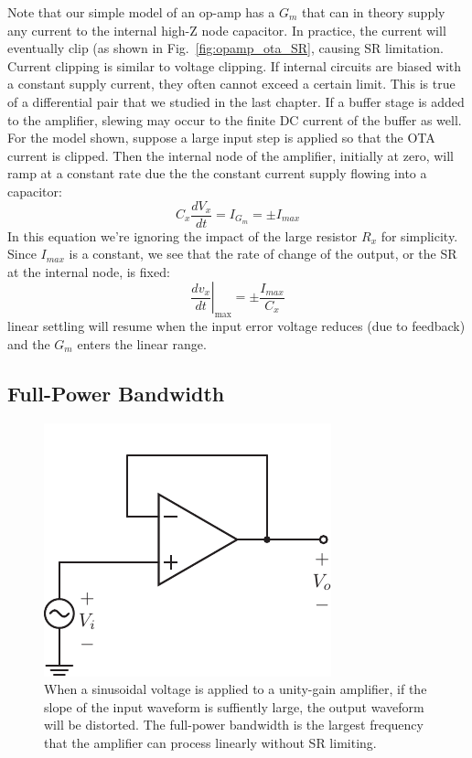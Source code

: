 Note that our simple model of an op-amp has a $G_m$ that can in theory supply any current to the internal high-Z node capacitor. In practice, the current will eventually clip (as shown in Fig.~\ref{fig:opamp_ota_SR}, causing SR limitation.  Current clipping is similar to voltage clipping. If internal circuits are biased with a constant supply current, they often cannot exceed a certain limit.  This is true of a differential pair that we studied in the last chapter.  If a buffer stage is added to the amplifier, slewing may occur to the finite DC current of the buffer as well.  For the model shown, suppose a large input step is applied so that the OTA current is clipped.  Then the internal node of the amplifier, initially at zero, will ramp at a constant rate due the the constant current supply flowing into a capacitor:
\begin{equation}
	C_x \frac{dV_x}{dt} = I_{G_m} = \pm I_{max} 
\end{equation}
In this equation we're ignoring the impact of the large resistor $R_x$ for simplicity.  Since $I_{max}$ is a constant, we see that the rate of change of the output, or the SR at the internal node, is fixed:
\begin{equation}
	\left.	\frac{dv_x}{dt} \right|_{\text{max}} = \pm \frac{I_{max}}{C_x} 
\end{equation}
linear settling will resume when the input error voltage reduces (due to feedback) and the $G_m$ enters the linear range.
\subsection{Full-Power Bandwidth}
\begin{figure}[tb]
\begin{center}
\includegraphics[scale=1]{opamp_unitygain}
\end{center}
\caption{When a sinusoidal voltage is applied to a unity-gain amplifier, if the slope of the input waveform is suffiently large, the output waveform will be distorted.  The full-power bandwidth is the largest frequency that the amplifier can process linearly without SR limiting.} \label{fig:opamp_unitygain}
\end{figure}

